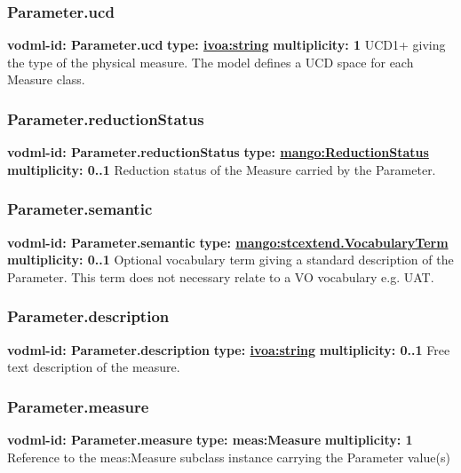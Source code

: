     \subsubsection{Parameter.ucd}
      \textbf{vodml-id: Parameter.ucd} \newline
      \textbf{type: \hyperref[sect:ivoa]{ivoa:string}} \newline
      \textbf{multiplicity: 1} \newline 
      UCD1+ giving the type of the physical measure. The model defines a UCD space for each Measure class.

    \subsubsection{Parameter.reductionStatus}
      \textbf{vodml-id: Parameter.reductionStatus} \newline
      \textbf{type: \hyperref[sect:ReductionStatus]{mango:ReductionStatus}} \newline
      \textbf{multiplicity: 0..1} \newline 
      Reduction status of the Measure carried by the Parameter.

    \subsubsection{Parameter.semantic}
      \textbf{vodml-id: Parameter.semantic} \newline
      \textbf{type: \hyperref[sect:stcextend.VocabularyTerm]{mango:stcextend.VocabularyTerm}} \newline
      \textbf{multiplicity: 0..1} \newline 
      Optional vocabulary term giving a standard description of the Parameter. This term does not necessary relate to a VO vocabulary e.g. UAT.

    \subsubsection{Parameter.description}
      \textbf{vodml-id: Parameter.description} \newline
      \textbf{type: \hyperref[sect:ivoa]{ivoa:string}} \newline
      \textbf{multiplicity: 0..1} \newline 
      Free text description of the measure.

    \subsubsection{Parameter.measure}
      \textbf{vodml-id: Parameter.measure} \newline
      \textbf{type: meas:Measure} \newline
      \textbf{multiplicity: 1} \newline 
      Reference to the meas:Measure subclass instance carrying the Parameter value(s)

